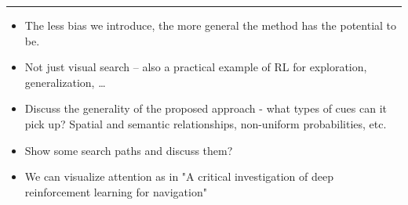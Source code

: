 


\rule{5cm}{1pt}

\begin{itemize}
    \item The less bias we introduce, the more general the method has the potential to be.
    \item Not just visual search -- also a practical example of RL for exploration, generalization, \dots
    \item Discuss the generality of the proposed approach - what types of cues can it pick up? Spatial and semantic relationships, non-uniform probabilities, etc. 
    \item Show some search paths and discuss them?
    \item We can visualize attention as in "A critical investigation of deep reinforcement learning for navigation"
\end{itemize}

